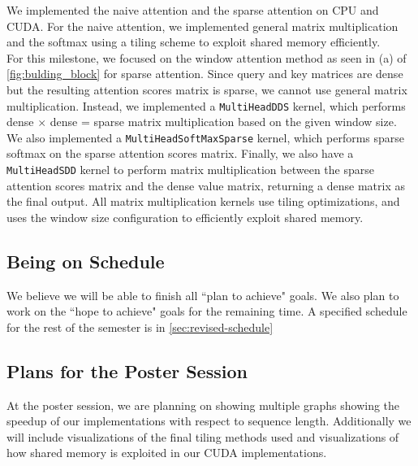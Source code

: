 \documentclass[11pt]{article}
\begin{document}
We implemented the naive attention and the sparse attention on CPU and CUDA. For the naive attention, we implemented general matrix multiplication and the softmax using a tiling scheme to exploit shared memory efficiently.\\
For this milestone, we focused on the window attention method as seen in (a) of \autoref{fig:bulding_block} for sparse attention. Since query and key matrices are dense but the resulting attention scores matrix is sparse, we cannot use general matrix multiplication. Instead, we implemented a \texttt{MultiHeadDDS} kernel, which performs dense $\times$ dense = sparse matrix multiplication based on the given window size. We also implemented a \texttt{MultiHeadSoftMaxSparse} kernel, which performs sparse softmax on the sparse attention scores matrix. Finally, we also have a \texttt{MultiHeadSDD} kernel to perform matrix multiplication between the sparse attention scores matrix and the dense value matrix, returning a dense matrix as the final output. All matrix multiplication kernels use tiling optimizations, and uses the window size configuration to efficiently exploit shared memory.

\subsection{Being on Schedule}

We believe we will be able to finish all ``plan to achieve" goals. We also plan to work on the ``hope to achieve" goals for the remaining time. A specified schedule for the rest of the semester is in \autoref{sec:revised-schedule}

\subsection{Plans for the Poster Session}
At the poster session, we are planning on showing multiple graphs showing the speedup of our implementations with respect to sequence length. Additionally we will include visualizations of the final tiling methods used and visualizations of how shared memory is exploited in our CUDA implementations.
\end{document}
